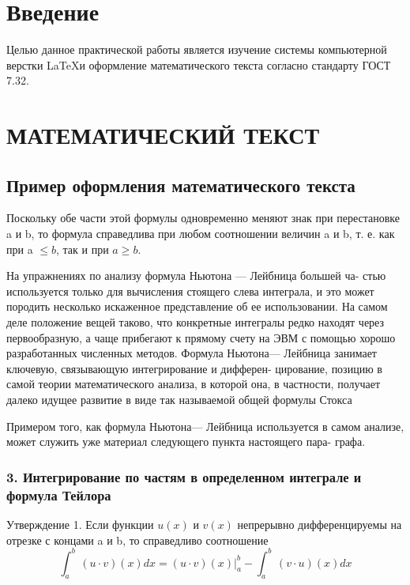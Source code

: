



\section*{Введение}
Целью данное практической работы является изучение системы компьютерной верстки \LaTeX и оформление математического текста согласно стандарту ГОСТ 7.32.
\newpage

\section{МАТЕМАТИЧЕСКИЙ ТЕКСТ\label{chapter1}}
\subsection{Пример оформления математического текста}

Поскольку обе части этой формулы одновременно меняют знак при перестановке a и b, то формула справедлива при любом соотношении величин a и b,
т. е. как при a $\leq b$, так и при $a \geq b$.

На упражнениях по анализу формула Ньютона — Лейбница большей ча-
стью используется только для вычисления стоящего слева интеграла, и это
может породить несколько искаженное представление об ее использовании.
На самом деле положение вещей таково, что конкретные интегралы редко
находят через первообразную, а чаще прибегают к прямому счету на ЭВМ
с помощью хорошо разработанных численных методов. Формула Ньютона—
Лейбница занимает ключевую, связывающую интегрирование и дифферен-
цирование, позицию в самой теории математического анализа, в которой
она, в частности, получает далеко идущее развитие в виде так называемой
общей формулы Стокса

Примером того, как формула Ньютона— Лейбница используется в самом
анализе, может служить уже материал следующего пункта настоящего пара-
графа.

\subsubsection{3. Интегрирование по частям в определенном интеграле и формула Тейлора}

Утверждение 1. Если функции $u(x)$ и $v(x)$ непрерывно дифференцируемы
на отрезке с концами a и b, то справедливо соотношение \\
\begin{equation}
	\int_{a}^{b}  \,(u\cdot v)(x)dx=(u \cdot v)(x)| _a^b - \int_{a}^{b} \, (v \cdot u) (x) dx
\end{equation}

